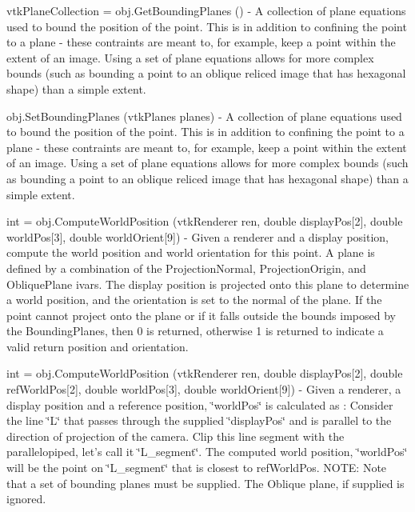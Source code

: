 \begin{DoxyItemize}
\item {\ttfamily vtk\-Plane\-Collection = obj.\-Get\-Bounding\-Planes ()} -\/ A collection of plane equations used to bound the position of the point. This is in addition to confining the point to a plane -\/ these contraints are meant to, for example, keep a point within the extent of an image. Using a set of plane equations allows for more complex bounds (such as bounding a point to an oblique reliced image that has hexagonal shape) than a simple extent.  
\item {\ttfamily obj.\-Set\-Bounding\-Planes (vtk\-Planes planes)} -\/ A collection of plane equations used to bound the position of the point. This is in addition to confining the point to a plane -\/ these contraints are meant to, for example, keep a point within the extent of an image. Using a set of plane equations allows for more complex bounds (such as bounding a point to an oblique reliced image that has hexagonal shape) than a simple extent.  
\item {\ttfamily int = obj.\-Compute\-World\-Position (vtk\-Renderer ren, double display\-Pos\mbox{[}2\mbox{]}, double world\-Pos\mbox{[}3\mbox{]}, double world\-Orient\mbox{[}9\mbox{]})} -\/ Given a renderer and a display position, compute the world position and world orientation for this point. A plane is defined by a combination of the Projection\-Normal, Projection\-Origin, and Oblique\-Plane ivars. The display position is projected onto this plane to determine a world position, and the orientation is set to the normal of the plane. If the point cannot project onto the plane or if it falls outside the bounds imposed by the Bounding\-Planes, then 0 is returned, otherwise 1 is returned to indicate a valid return position and orientation.  
\item {\ttfamily int = obj.\-Compute\-World\-Position (vtk\-Renderer ren, double display\-Pos\mbox{[}2\mbox{]}, double ref\-World\-Pos\mbox{[}2\mbox{]}, double world\-Pos\mbox{[}3\mbox{]}, double world\-Orient\mbox{[}9\mbox{]})} -\/ Given a renderer, a display position and a reference position, \char`\"{}world\-Pos\char`\"{} is calculated as \-: Consider the line \char`\"{}\-L\char`\"{} that passes through the supplied \char`\"{}display\-Pos\char`\"{} and is parallel to the direction of projection of the camera. Clip this line segment with the parallelopiped, let's call it \char`\"{}\-L\-\_\-segment\char`\"{}. The computed world position, \char`\"{}world\-Pos\char`\"{} will be the point on \char`\"{}\-L\-\_\-segment\char`\"{} that is closest to ref\-World\-Pos. N\-O\-T\-E\-: Note that a set of bounding planes must be supplied. The Oblique plane, if supplied is ignored.  

\end{DoxyItemize}
